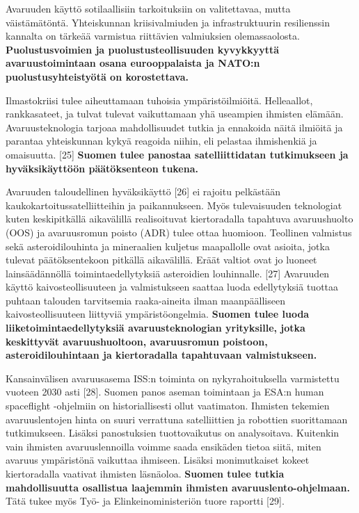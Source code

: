 \documentclass[nobib,finnish,oneside,openany,notoc,a4paper]{tufte-book}
\begin{document}
Avaruuden käyttö sotilaallisiin tarkoituksiin on valitettavaa, mutta
väistämätöntä. Yhteiskunnan kriisivalmiuden ja infrastruktuurin
resilienssin kannalta on tärkeää varmistua riittävien valmiuksien
olemassaolosta. \textbf{Puolustusvoimien ja puolustusteollisuuden
kyvykkyyttä avaruustoimintaan osana eurooppalaista ja NATO:n
puolustusyhteistyötä on korostettava.}

Ilmastokriisi tulee aiheuttamaan tuhoisia ympäristöilmiöitä.
Helleaallot, rankkasateet, ja tulvat tulevat vaikuttamaan yhä useampien
ihmisten elämään. Avaruusteknologia tarjoaa mahdollisuudet tutkia ja
ennakoida näitä ilmiöitä ja parantaa yhteiskunnan kykyä reagoida niihin,
eli pelastaa ihmishenkiä ja omaisuutta. {[}25{]} \textbf{Suomen tulee
panostaa satelliittidatan tutkimukseen ja hyväksikäyttöön päätöksenteon
tukena. }

Avaruuden taloudellinen hyväksikäyttö {[}26{]} ei rajoitu pelkästään
kaukokartoitussatelliitteihin ja paikannukseen. Myös tulevaisuuden
teknologiat kuten keskipitkällä aikavälillä realisoituvat kiertoradalla
tapahtuva avaruushuolto (OOS) ja avaruusromun poisto (ADR) tulee ottaa
huomioon. Teollinen valmistus sekä asteroidilouhinta ja mineraalien
kuljetus maapallolle ovat asioita, jotka tulevat päätöksentekoon
pitkällä aikavälillä. Eräät valtiot ovat jo luoneet lainsäädännöllä
toimintaedellytyksiä asteroidien louhinnalle. {[}27{]} Avaruuden käyttö
kaivosteollisuuteen ja valmistukseen saattaa luoda edellytyksiä tuottaa
puhtaan talouden tarvitsemia raaka-aineita ilman maanpäälliseen
kaivosteollisuuteen liittyviä ympäristöongelmia. \textbf{Suomen tulee
luoda liiketoimintaedellytyksiä avaruusteknologian yrityksille, jotka
keskittyvät avaruushuoltoon, avaruusromun poistoon, asteroidilouhintaan
ja kiertoradalla tapahtuvaan valmistukseen.}

Kansainvälisen avaruusasema ISS:n toiminta on nykyrahoituksella
varmistettu vuoteen 2030 asti {[}28{]}. Suomen panos aseman toimintaan
ja ESA:n human spaceflight -ohjelmiin on historiallisesti ollut
vaatimaton. Ihmisten tekemien avaruuslentojen hinta on suuri verrattuna
satelliittien ja robottien suorittamaan tutkimukseen. Lisäksi
panostuksien tuottovaikutus on analysoitava. Kuitenkin vain ihmisten
avaruuslennoilla voimme saada ensikäden tietoa siitä, miten avaruus
ympäristönä vaikuttaa ihmiseen. Lisäksi monimutkaiset kokeet
kiertoradalla vaativat ihmisten läsnäoloa. \textbf{Suomen tulee tutkia
mahdollisuutta osallistua laajemmin ihmisten avaruuslento-ohjelmaan.
}Tätä tukee myös Työ- ja Elinkeinoministeriön tuore raportti {[}29{]}.
\end{document}
